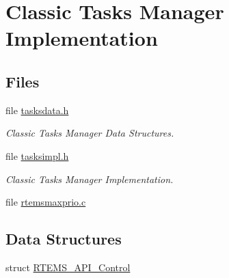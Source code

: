 \hypertarget{group__ClassicTasksImpl}{}\section{Classic Tasks Manager Implementation}
\label{group__ClassicTasksImpl}
\subsection*{Files}
\begin{DoxyCompactItemize}
\item 
file \mbox{\hyperlink{tasksdata_8h}{tasksdata.\+h}}
\begin{DoxyCompactList}\small\item\em Classic Tasks Manager Data Structures. \end{DoxyCompactList}\item 
file \mbox{\hyperlink{tasksimpl_8h}{tasksimpl.\+h}}
\begin{DoxyCompactList}\small\item\em Classic Tasks Manager Implementation. \end{DoxyCompactList}\item 
file \mbox{\hyperlink{rtemsmaxprio_8c}{rtemsmaxprio.\+c}}
\end{DoxyCompactItemize}
\subsection*{Data Structures}
\begin{DoxyCompactItemize}
\item 
struct \mbox{\hyperlink{structRTEMS__API__Control}{R\+T\+E\+M\+S\+\_\+\+A\+P\+I\+\_\+\+Control}}
\end{DoxyCompactItemize}
